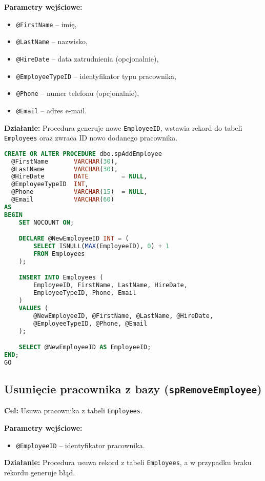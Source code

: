 \documentclass[12pt]{article}
\begin{document}
\textbf{Parametry wejściowe:}
\begin{itemize}
  \item \verb|@FirstName| – imię,
  \item \verb|@LastName| – nazwisko,
  \item \verb|@HireDate| – data zatrudnienia (opcjonalnie),
  \item \verb|@EmployeeTypeID| – identyfikator typu pracownika,
  \item \verb|@Phone| – numer telefonu (opcjonalnie),
  \item \verb|@Email| – adres e-mail.
\end{itemize}

\textbf{Działanie:} Procedura generuje nowe \verb|EmployeeID|, wstawia rekord do tabeli \verb|Employees| oraz zwraca ID nowo dodanego pracownika.

\begin{lstlisting}[language=SQL]
CREATE OR ALTER PROCEDURE dbo.spAddEmployee
  @FirstName       VARCHAR(30),
  @LastName        VARCHAR(30),
  @HireDate        DATE         = NULL,
  @EmployeeTypeID  INT,
  @Phone           VARCHAR(15)  = NULL,
  @Email           VARCHAR(60)
AS
BEGIN
    SET NOCOUNT ON;

    DECLARE @NewEmployeeID INT = (
        SELECT ISNULL(MAX(EmployeeID), 0) + 1
        FROM Employees
    );

    INSERT INTO Employees (
        EmployeeID, FirstName, LastName, HireDate,
        EmployeeTypeID, Phone, Email
    )
    VALUES (
        @NewEmployeeID, @FirstName, @LastName, @HireDate,
        @EmployeeTypeID, @Phone, @Email
    );

    SELECT @NewEmployeeID AS EmployeeID;
END;
GO
\end{lstlisting}

\newpage
\subsection{Usunięcie pracownika z bazy (\texttt{spRemoveEmployee})}
\textbf{Cel:} Usuwa pracownika z tabeli \verb|Employees|.

\textbf{Parametry wejściowe:}
\begin{itemize}
  \item \verb|@EmployeeID| – identyfikator pracownika.
\end{itemize}

\textbf{Działanie:} Procedura usuwa rekord z tabeli \verb|Employees|, a w przypadku braku rekordu generuje błąd.
\end{document}
